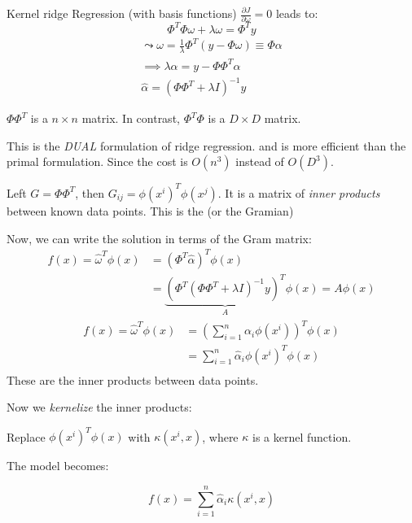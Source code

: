 \begin{example}[breakable]{Kernel ridge Regression (with basis functions)}{}
	$\frac{\partial J}{\partial \omega} = 0$ leads to:
	\begin{equation*}
		\Phi^T\Phi \omega + \lambda \omega = \Phi^T y \tag{normal equations}
	\end{equation*}
	\begin{align*}
		\leadsto \omega = \frac{1}{\lambda} \Phi^T (y - \Phi \omega)
		\equiv \Phi \alpha                              \\
		\implies \lambda \alpha = y - \Phi\Phi^T \alpha \\
		\hat \alpha = (\Phi\Phi^T + \lambda I)^{-1}y
	\end{align*}

	\begin{note}
		$\Phi\Phi^T$ is a $n\times n$ matrix. In contrast, $\Phi^T\Phi$ is a
		$D\times D$ matrix.

		This is the \emph{DUAL} formulation of ridge regression.
		and is more efficient than the primal formulation. Since
		the cost is $O(n^3)$ instead of $O(D^3)$.
	\end{note}

	Left $G = \Phi\Phi^T$, then $G_{ij} = \phi(x^i)^T \phi(x^j)$.
	It is a matrix of \emph{inner products} between known
	data points. This is the  (or the Gramian)

	\tcbline

	Now, we can write the solution in terms of the Gram matrix:
	\begin{align*}
		f(x) = \hat \omega^T \phi(x) & = (\Phi^T\hat\alpha)^T \phi(x) \\
		                             & =
		\underbrace{(\Phi^T(\Phi\Phi^T + \lambda I)^{-1}y)^T}_A \phi(x) = A\phi(x)
	\end{align*}
	\begin{align*}
		f(x) = \hat\omega^T \phi(x) & =
		\left(
		\sum_{i=1}^n \alpha_i \phi(x^i)
		\right)^T \phi(x)                                                             \\
		                            & = \sum_{i=1}^n \hat\alpha_i \phi(x^i)^T \phi(x) \\
	\end{align*}
	These are the inner products between data points.

	Now we \emph{kernelize} the inner products:

	Replace $\phi(x^i)^T \phi(x)$ with $\kappa(x^i, x)$, where $\kappa$ is a
	kernel function.

	The model becomes:

	\begin{equation*}
		f(x) = \sum_{i=1}^n \hat\alpha_i \kappa(x^i, x)
	\end{equation*}


\end{example}
